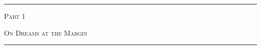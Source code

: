 \documentclass[smalldemyvopaper,11pt,twoside,onecolumn,openright,extrafontsizes]{memoir}
\newcommand{\press}{}
\newlength\drop
\begin{document}

\clearpage
\thispagestyle{empty}
\begin{center}
	\vspace*{\drop}
	\rule{\textwidth}{0in}\par
	{\HUGE\textsc{Part 1\\[1in]} \par}
	{\textsc{On Dreams at the Margin}\\[1in]}%
	\rule{\textwidth}{0in}\par
	\vfill
	{\Large\scshape\press}
\end{center}













\end{document}
